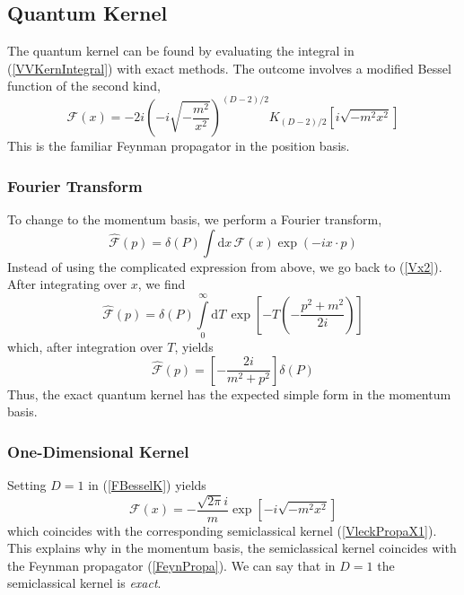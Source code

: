 \subsection{Quantum Kernel}
The quantum kernel can be found by evaluating the integral in (\ref{VVKernIntegral}) with exact methods. The outcome involves a modified Bessel function of the second kind,
\begin{equation}
	\mathcal{F}(x) = -2i \left(- i \sqrt{-\frac{m^{2}}{x^{2}}} \right)^{(D - 2)/2} K_{(D-2)/2} \left[ i \sqrt{- m^{2} x^{2}} \right] \label{FBesselK}
\end{equation}
This is the familiar Feynman propagator in the position basis.
\subsubsection{Fourier Transform}
To change to the momentum basis, we perform a Fourier transform,
\begin{equation}
	\widehat{\mathcal{F}}(p) = \delta(P) \int \mathrm{d}x \, \mathcal{F}(x) \exp{\left( - i x \cdot p \right)}
\end{equation}
Instead of using the complicated expression from above, we go back to (\ref{Vx2}). After integrating over $x$, we find
\begin{equation}
	\widehat{\mathcal{F}}(p) = \delta(P) \int\limits_{0}^{\infty} \mathrm{d}T \, \exp{\left[ - T \left( -\frac{p^{2} + m^{2}}{2i} \right) \right]}
\end{equation}
which, after integration over $T$, yields
\begin{equation}
	\widehat{\mathcal{F}}(p) = \left[ - \frac{2i}{m^{2} + p^{2}} \right] \delta(P) \label{FeynPropa}
\end{equation}
Thus, the exact quantum kernel has the expected simple form in the momentum basis.
\subsubsection{One-Dimensional Kernel}
Setting $D = 1$ in (\ref{FBesselK}) yields
\begin{equation}
	\mathcal{F}(x) = - \frac{\sqrt{2 \pi} i}{m} \exp{\left[ - i \sqrt{- m^{2} x^{2}} \right]}
\end{equation}
which coincides with the corresponding semiclassical kernel (\ref{VleckPropaX1}). This explains why in the momentum basis, the semiclassical kernel coincides with the Feynman propagator (\ref{FeynPropa}). We can say that in $D = 1$ the semiclassical kernel is \textit{exact}.
